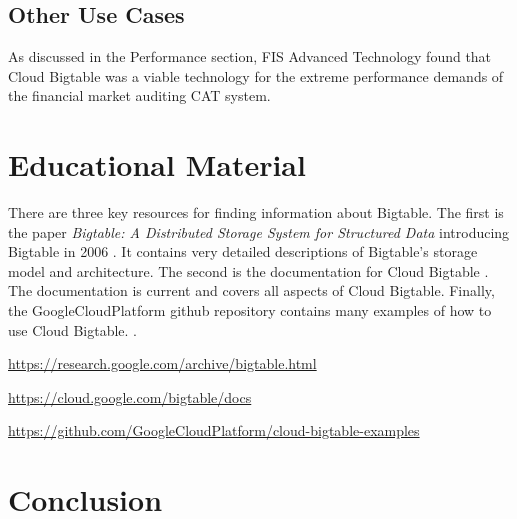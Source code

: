 \documentclass[9pt,twocolumn,twoside]{styles/osajnl}
\begin{document}
\subsection{Other Use Cases}

As discussed in the Performance section, FIS Advanced Technology found that Cloud Bigtable was a viable technology for the extreme performance demands of the financial market auditing CAT system. \cite{www-fis}

\section{Educational Material}

There are three key resources for finding information about Bigtable. The first is the paper \emph{Bigtable: A Distributed Storage System for Structured Data} introducing Bigtable in 2006 \cite{introbigtable}.  It contains very detailed descriptions of Bigtable's storage model and architecture. The second is the documentation for Cloud Bigtable \cite{www-bigtabledocumentation}.  The documentation is current and covers all aspects of Cloud Bigtable. Finally, the GoogleCloudPlatform github repository contains many examples of how to use Cloud Bigtable. \cite{git-googlecloud}.


\url{https://research.google.com/archive/bigtable.html}
 
\url{https://cloud.google.com/bigtable/docs}

\url{https://github.com/GoogleCloudPlatform/cloud-bigtable-examples}


\section{Conclusion}




 
\end{document}
